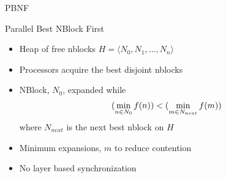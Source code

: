 \documentclass[style=unh]{powerdot}
\begin{document}
\begin{slide}{PBNF}
  \vspace{.2in}
  \begin{center}
    Parallel Best NBlock First
  \end{center}

  \begin{itemize}
  \item Heap of free nblocks $H = \langle N_0, N_1, ..., N_n \rangle$
  \item Processors acquire the best disjoint nblocks
  \item NBlock, $N_0$, expanded while
    \begin{eqnarray*}
      (\mathop{\rm min}_{n \in N_0} f(n)) < (\mathop{\rm min}_{m \in N_{next}} f(m))
    \end{eqnarray*}
    where $N_{next}$ is the next best nblock on $H$
  \item Minimum expansions, $m$ to reduce contention
  \item No layer based synchronization
  \end{itemize}

\end{slide}

\end{document}
